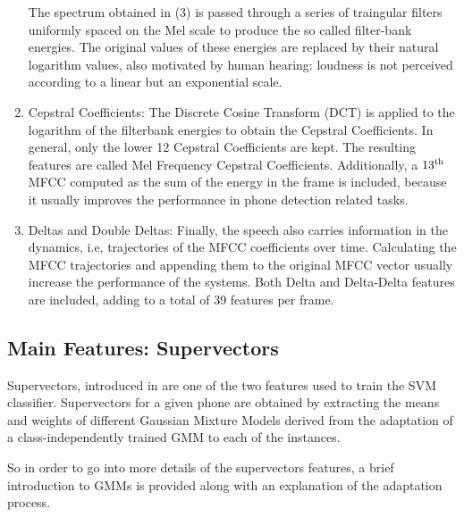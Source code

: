\begin{enumerate}
  The spectrum obtained in (3) is passed through a series of traingular filters
  uniformly spaced on the Mel scale to produce the so called filter-bank energies.
  The original values of these energies are replaced by their natural logarithm values,
  also motivated by human hearing: loudness is not perceived according to
  a linear but an exponential scale.

  \item Cepstral Coefficients: The Discrete Cosine Transform (DCT) is applied to the logarithm
  of the filterbank energies to obtain the Cepstral Coefficients. In general, only the lower
  12 Cepstral Coefficients are kept. The resulting features are called Mel Frequency
  Cepstral Coefficients. Additionally, a $13\textsuperscript{th}$ MFCC computed
  as the sum of the energy in the frame is included,
  because it usually improves the performance in phone detection
  related tasks.

  \item Deltas and Double Deltas: Finally, the speech also carries information
  in the dynamics, i.e, trajectories of the MFCC coefficients over time. Calculating
  the MFCC trajectories and appending them to the original MFCC vector usually increase the
  performance of the systems. Both Delta and Delta-Delta features are included, adding to
  a total of 39 features per frame.

\end{enumerate}

\subsection{Main Features: Supervectors}

Supervectors, introduced in \cite{main} are one of the two features used to train the SVM
classifier. Supervectors for a given phone are obtained by extracting the means and weights
of different
Gaussian Mixture Models derived from the adaptation of a class-independently trained GMM
to each of the instances.

So in order to go into more details of the supervectors features, a brief introduction to
GMMs is provided along with an explanation of the adaptation process.
